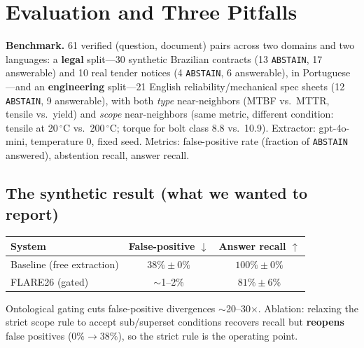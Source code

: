 \documentclass[11pt]{article}
\begin{document}
\section{Evaluation and Three Pitfalls}
\label{sec:eval}
\textbf{Benchmark.} 61 verified (question, document) pairs across two domains and
two languages: a \textbf{legal} split---30 synthetic Brazilian contracts (13
\texttt{ABSTAIN}, 17 answerable) and 10 real tender notices (4 \texttt{ABSTAIN},
6 answerable), in Portuguese---and an \textbf{engineering} split---21 English
reliability/mechanical spec sheets (12 \texttt{ABSTAIN}, 9 answerable), with both
\emph{type} near-neighbors (MTBF vs.\ MTTR, tensile vs.\ yield) and \emph{scope}
near-neighbors (same metric, different condition: tensile at 20\,$^\circ$C vs.\
200\,$^\circ$C; torque for bolt class 8.8 vs.\ 10.9). Extractor: gpt-4o-mini,
temperature $0$, fixed seed. Metrics: false-positive rate (fraction of
\texttt{ABSTAIN} answered), abstention recall, answer recall.

\subsection{The synthetic result (what we wanted to report)}
\begin{table}[h]\centering
\begin{tabular}{lcc}
\toprule
System & False-positive $\downarrow$ & Answer recall $\uparrow$ \\
\midrule
Baseline (free extraction) & $38\% \pm 0\%$ & $100\% \pm 0\%$ \\
FLARE26 (gated)            & $\sim$1--2\%   & $81\% \pm 6\%$ \\
\bottomrule
\end{tabular}
\end{table}
Ontological gating cuts false-positive divergences $\sim$20--30$\times$. Ablation:
relaxing the strict scope rule to accept sub/superset conditions recovers recall
but \textbf{reopens} false positives ($0\% \to 38\%$), so the strict rule is the
operating point.
\end{document}
